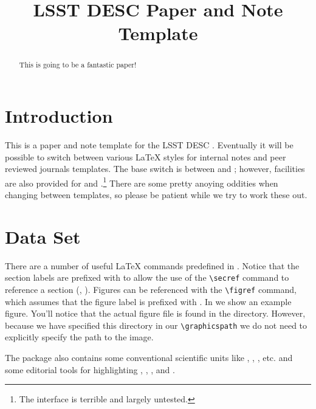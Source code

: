 \documentclass[]{emulateapj}
\begin{document}
 

\title{LSST DESC Paper and Note Template}


\begin{abstract}

This is going to be a fantastic paper!

\end{abstract}

\maketitle

\section{Introduction}
\label{sec:intro}

This is a paper and note template for the LSST DESC \citep{Overview,ScienceBook,WhitePaper}.  Eventually it will be possible to switch between various \LaTeX\xspace styles for internal notes and peer reviewed journals templates. The base switch is between  and ; however, facilities are also provided for  and .\footnote{The  interface is terrible and largely untested.}  There are some pretty anoying oddities when changing between templates, so please be patient while we try to work these out. 


\section{Data Set}
\label{sec:data}

There are a number of useful \LaTeX\xspace commands predefined in .
Notice that the section labels are prefixed with  to allow the use of the \verb=\secref= command to reference a section (\ie, ).
Figures can be referenced with the \verb=\figref= command, which assumes that the figure label is prefixed with .
In  we show an example figure.
You'll notice that the actual figure file is found in the  directory. However, because we have specified this directory in our \verb=\graphicspath= we do not need to explicitly specify the path to the image. 

The  package also contains some conventional scientific units like \angstrom, \GeV, \Msun, etc. and some editorial tools for highlighting , , , and .
\end{document}
